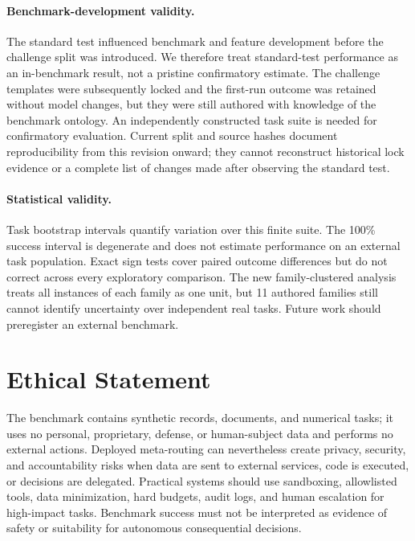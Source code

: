 \documentclass[letterpaper]{article} %
\begin{document}
\paragraph{Benchmark-development validity.}
The standard test influenced benchmark and feature development before the challenge split was introduced. We therefore treat standard-test performance as an in-benchmark result, not a pristine confirmatory estimate. The challenge templates were subsequently locked and the first-run outcome was retained without model changes, but they were still authored with knowledge of the benchmark ontology. An independently constructed task suite is needed for confirmatory evaluation. Current split and source hashes document reproducibility from this revision onward; they cannot reconstruct historical lock evidence or a complete list of changes made after observing the standard test.

\paragraph{Statistical validity.}
Task bootstrap intervals quantify variation over this finite suite. The 100\% success interval is degenerate and does not estimate performance on an external task population. Exact sign tests cover paired outcome differences but do not correct across every exploratory comparison. The new family-clustered analysis treats all instances of each family as one unit, but 11 authored families still cannot identify uncertainty over independent real tasks. Future work should preregister an external benchmark.

\section*{Ethical Statement}

The benchmark contains synthetic records, documents, and numerical tasks; it uses no personal, proprietary, defense, or human-subject data and performs no external actions. Deployed meta-routing can nevertheless create privacy, security, and accountability risks when data are sent to external services, code is executed, or decisions are delegated. Practical systems should use sandboxing, allowlisted tools, data minimization, hard budgets, audit logs, and human escalation for high-impact tasks. Benchmark success must not be interpreted as evidence of safety or suitability for autonomous consequential decisions.



\end{document}
